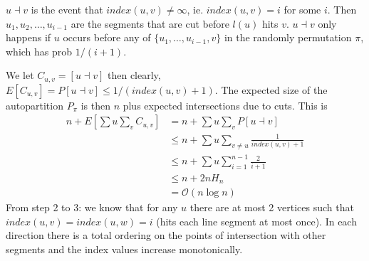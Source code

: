 \documentclass[a4paper]{article}
\begin{document}
$u \dashv v$ is the event that $index(u,v)\not = \infty$, ie. $index(u,v)=i$ for some $i$. Then $u_1,u_2,\ldots,u_{i-1}$ are the segments that are cut before $l(u)$ hits $v$. $u \dashv v$ only happens if $u$ occurs before any of $\{u_1,\ldots,u_{i-1},v\}$ in the randomly permutation $\pi$, which has prob $1/(i+1)$.

We let $C_{u,v}=[u\dashv v]$ then clearly, $E[C_{u,v}]=P[u\dashv v]\leq 1/(index(u,v)+1)$. The expected size of the autopartition $P_{\pi}$ is then $n$ plus expected intersections due to cuts. This is 
\begin{align*}
  n+E\left[\sum{u}\sum_{v}  C_{u,v} \right] &=    n+\sum{u}\sum_{v} P\left[ u \dashv v \right]\\
                                            &\leq n+\sum{u}\sum_{v\not = u}\frac{1}{index(u,v)+1}\\
                                            &\leq n+\sum{u}\sum_{i=1}^{n-1}\frac{2}{i+1}\\
                                            &\leq n+2nH_n\\
                                            &=    \mathcal{O}(n\log n)
\end{align*}
From step 2 to 3: we know that for any $u$ there are at most 2 vertices such that $index(u,v)=index(u,w)=i$ (hits each line segment at most once). In each direction there is a total ordering on the points of intersection with other segments and the index values increase monotonically.
\end{document}
